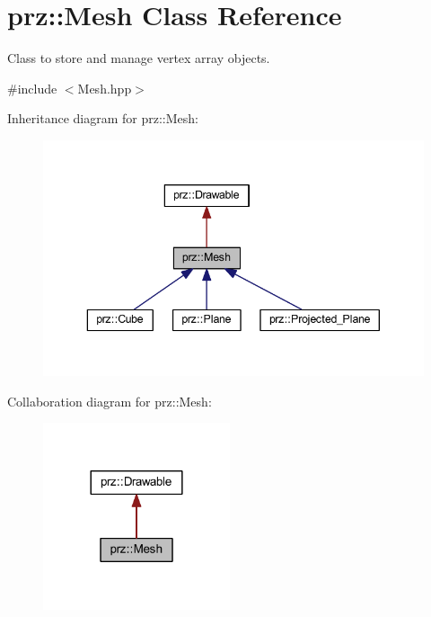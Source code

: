 \hypertarget{classprz_1_1_mesh}{}\section{prz\+::Mesh Class Reference}
\label{classprz_1_1_mesh}


Class to store and manage vertex array objects.  




{\ttfamily \#include $<$Mesh.\+hpp$>$}



Inheritance diagram for prz\+::Mesh\+:
\nopagebreak
\begin{figure}[H]
\begin{center}
\leavevmode
\includegraphics[width=343pt]{classprz_1_1_mesh__inherit__graph}
\end{center}
\end{figure}


Collaboration diagram for prz\+::Mesh\+:
\nopagebreak
\begin{figure}[H]
\begin{center}
\leavevmode
\includegraphics[width=156pt]{classprz_1_1_mesh__coll__graph}
\end{center}
\end{figure}
